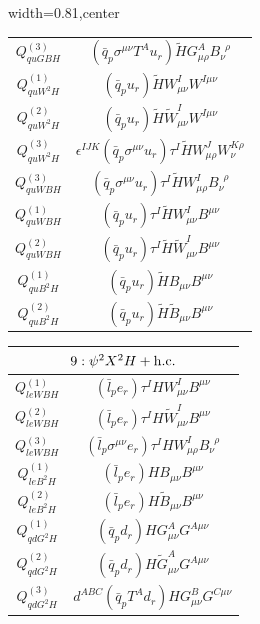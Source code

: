 \begin{table}[H]
\begin{center}
\begin{adjustbox}{width=0.81\textwidth,center}
\begin{minipage}[t]{5.6cm}
\begin{tabular}[t]{c|c}
% 
$Q_{quGBH}^{(3)}$  &  $(\bar q_p \sigma^{\mu\nu} T^A u_r) \widetilde H G_{\mu\rho}^A B_\nu^{\,\,\,\rho}$ \\
%
$Q_{quW^2H}^{(1)}$  &  $(\bar q_p u_r) \widetilde H W^I_{\mu\nu} W^{I\mu\nu} $ \\
% 
$Q_{quW^2H}^{(2)}$  &  $(\bar q_p u_r) \widetilde H \widetilde W^I_{\mu\nu} W^{I\mu\nu} $ \\
% 
$Q_{quW^2H}^{(3)}$  &  $\epsilon^{IJK} (\bar q_p \sigma^{\mu\nu} u_r) \tau^I \widetilde H W_{\mu\rho}^J W_\nu^{K\rho}$ \\
%
$Q_{quWBH}^{(3)}$  &  $(\bar q_p \sigma^{\mu\nu} u_r) \tau^I \widetilde H W_{\mu\rho}^I B_\nu^{\,\,\,\rho}$ \\
%
$Q_{quWBH}^{(1)}$  &  $(\bar q_p u_r) \tau^I \widetilde H W^I_{\mu\nu} B^{\mu\nu}$ \\
% 
$Q_{quWBH}^{(2)}$  &  $(\bar q_p u_r) \tau^I \widetilde H \widetilde W^I_{\mu\nu} B^{\mu\nu} $ \\
% 
$Q_{quB^2H}^{(1)}$  &  $(\bar q_p u_r) \widetilde H B_{\mu\nu} B^{\mu\nu} $ \\
% 
$Q_{quB^2H}^{(2)}$  &  $(\bar q_p u_r) \widetilde H \widetilde B_{\mu\nu} B^{\mu\nu}$
\end{tabular}
\end{minipage}
\hspace{1cm}
\begin{minipage}[t]{5.6cm}
\renewcommand{\arraystretch}{1.5}
\begin{tabular}[t]{c|c}
\multicolumn{2}{c}{\boldmath$9:\psi^2X^2H + \mathrm{h.c.}$} \\
\hline
$Q_{leWBH}^{(1)}$  &  $(\bar l_p e_r) \tau^I H W^I_{\mu\nu} B^{\mu\nu} $ \\
% 
$Q_{leWBH}^{(2)}$  &  $(\bar l_p e_r) \tau^I H \widetilde W^I_{\mu\nu} B^{\mu\nu} $ \\
% 
$Q_{leWBH}^{(3)}$  &  $(\bar l_p \sigma^{\mu\nu} e_r) \tau^I H W_{\mu\rho}^I B_\nu^{\,\,\,\rho}$ \\
%
$Q_{leB^2H}^{(1)}$  &  $(\bar l_p e_r) H B_{\mu\nu} B^{\mu\nu} $ \\
% 
$Q_{leB^2H}^{(2)}$  &  $(\bar l_p e_r) H \widetilde B_{\mu\nu} B^{\mu\nu} $ \\
% 
$Q_{qdG^2H}^{(1)}$  &  $(\bar q_p d_r) H G^A_{\mu\nu} G^{A\mu\nu} $ \\
% 
$Q_{qdG^2H}^{(2)}$  &  $(\bar q_p d_r) H \widetilde G^A_{\mu\nu} G^{A\mu\nu} $ \\
% 
$Q_{qdG^2H}^{(3)}$  &  $d^{ABC} (\bar q_p T^A d_r) H G^B_{\mu\nu} G^{C\mu\nu} $ \\

\end{tabular}
\end{minipage}
\end{adjustbox}
\end{center}
\end{table}
